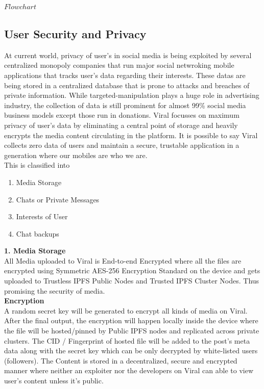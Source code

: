 \documentclass[10pt]{article}
\begin{document}
$Flow chart$

\subsection{User Security and Privacy}

At current world, privacy of user's in social media is being exploited by several centralized monopoly companies that run major social netwroking mobile applications that tracks user's data regarding their interests. These datas are being stored in a centralized database that is prone to attacks and breaches of private information. While targeted-manipulation plays a huge role in advertising industry, the collection of data is still prominent for almost 99\% social media business models except those run in donations. Viral focusses on maximum privacy of user's data by eliminating a central point of storage and heavily encrypts the media content circulating in the platform. It is possible to say Viral collects zero data of users and maintain a secure, trustable application in a generation where our mobiles are who we are.\\

This is classified into
\begin{enumerate}[leftmargin=+0.2in]
\item Media Storage
\item Chats or Private Messages
\item Interests of User
\item Chat backups
\end{enumerate}

\textbf{1. Media Storage}\\

All Media uploaded to Viral is End-to-end Encrypted where all the files are encrypted using Symmetric AES-256 Encryption Standard on the device and gets uploaded to Trustless IPFS Public Nodes and Trusted IPFS Cluster Nodes. Thus promising the security of media.\\

\textbf{Encryption}\\

A random secret key will be generated to encrypt all kinds of media on Viral. After the final output, the encryption will happen locally inside the device where the file will be hosted/pinned by Public IPFS nodes and replicated across private clusters. The CID / Fingerprint of hosted file will be added to the post's meta data along with the secret key which can be only decrypted by white-listed users (followers). The Content is stored in a decentralized, secure and encrypted manner where neither an exploiter nor the developers on Viral can able to view user's content unless it's public.
\end{document}
